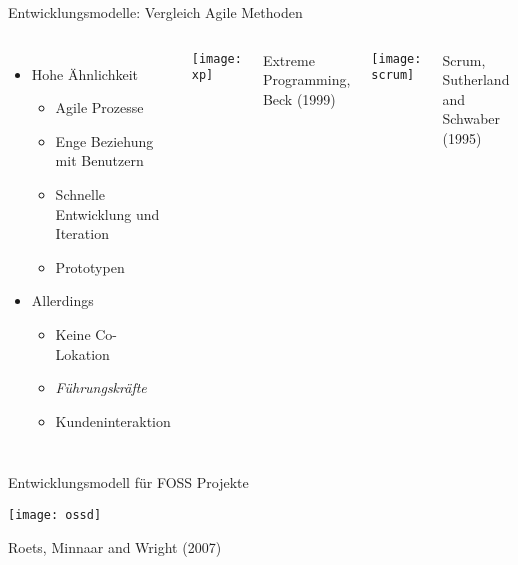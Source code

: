 \documentclass[11pt]{beamer}
\begin{document}
\begin{frame}{Entwicklungsmodelle: Vergleich Agile Methoden}
  \begin{center}
  \begin{columns}[T]
  \begin{itemize}
    \item Hohe Ähnlichkeit
    \begin{itemize}
      \item Agile Prozesse
      \item Enge Beziehung mit Benutzern
      \item Schnelle Entwicklung und Iteration
      \item Prototypen
    \end{itemize}
    \item Allerdings
    \begin{itemize}
      \item Keine Co-Lokation
      \item \emph{Führungskräfte}
      \item Kundeninteraktion
    \end{itemize}
  \end{itemize}
  \texttt{[image: xp]}

  {\tiny\hfill
  Extreme Programming, Beck (1999)
  }
  \vspace{1em}

  \texttt{[image: scrum]}

  {\tiny\hfill
  Scrum, Sutherland and Schwaber (1995)
  }
  \end{columns}
  \end{center}
\end{frame}

\begin{frame}{Entwicklungsmodell für FOSS Projekte}
  \begin{center}
    \texttt{[image: ossd]}

    {\tiny\hfill
    Roets, Minnaar and Wright (2007)
    }
  \end{center}
\end{frame}
\end{document}
